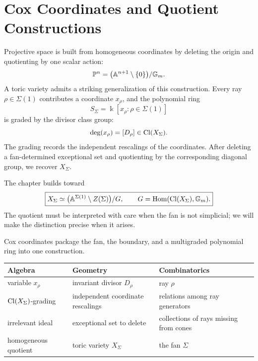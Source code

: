\chapter[Cox Coordinates and Quotient Constructions]
{Cox Coordinates and Quotient\\ Constructions}
\label{chap:cox-coordinates-quotients}

\begin{chapteroverview}
Projective space is built from homogeneous coordinates by deleting the
origin and quotienting by one scalar action:
\[
\mathbb{P}^n
=
\bigl(\mathbb{A}^{n+1}\setminus\{0\}\bigr)/\mathbb{G}_{m}.
\]
A toric variety admits a striking generalization of this construction.
Every ray \(\rho\in\Sigma(1)\) contributes a coordinate \(x_\rho\), and
the polynomial ring
\[
S_\Sigma=\Bbbk[x_\rho:\rho\in\Sigma(1)]
\]
is graded by the divisor class group:
\[
\deg(x_\rho)=[D_\rho]\in\operatorname{Cl}(X_\Sigma).
\]
The grading records the independent rescalings of the coordinates.
After deleting a fan-determined exceptional set and quotienting by the
corresponding diagonal group, we recover \(X_\Sigma\).

The chapter builds toward
\[
\boxed{
X_\Sigma
\simeq
\bigl(\mathbb{A}^{\Sigma(1)}\setminus Z(\Sigma)\bigr)/G,
\qquad
G=\operatorname{Hom}(\operatorname{Cl}(X_\Sigma),\mathbb{G}_{m}).
}
\]
The quotient must be interpreted with care when the fan is not
simplicial; we will make the distinction precise when it arises.
\end{chapteroverview}

\begin{threedictionaries}
Cox coordinates package the fan, the boundary, and a multigraded
polynomial ring into one construction.

\medskip

\begin{center}
\small
\begin{tabularx}{\linewidth}{@{}
  >{\raggedright\arraybackslash}X
  >{\raggedright\arraybackslash}X
  >{\raggedright\arraybackslash}X@{}}
\toprule
\textbf{Algebra}
&
\textbf{Geometry}
&
\textbf{Combinatorics}
\\
\midrule
variable \(x_\rho\)
&
invariant divisor \(D_\rho\)
&
ray \(\rho\)
\\
\(\operatorname{Cl}(X_\Sigma)\)-grading
&
independent coordinate rescalings
&
relations among ray generators
\\
irrelevant ideal
&
exceptional set to delete
&
collections of rays missing from cones
\\
homogeneous quotient
&
toric variety \(X_\Sigma\)
&
the fan \(\Sigma\)
\\
\bottomrule
\end{tabularx}
\end{center}
\end{threedictionaries}

